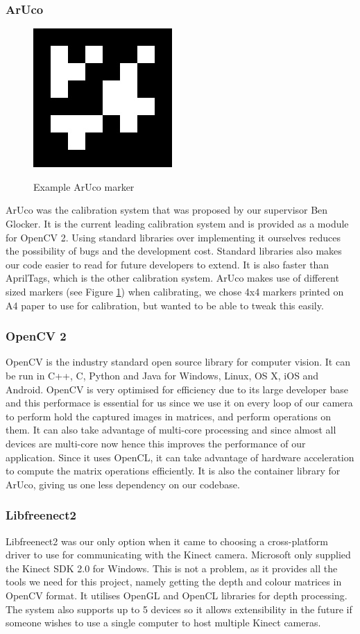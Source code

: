 \documentclass{article}
\begin{document}
\subsubsection{ArUco}
\begin{figure}[h]
  \centering
  \includegraphics[scale=0.6]{aruco}
  \label{fig:arucomarker}  
  \caption{Example ArUco marker}  
\end{figure} 
ArUco was the calibration system that was proposed by our supervisor Ben Glocker. It is the current leading calibration system and is provided as a module for OpenCV 2. Using standard libraries over implementing it ourselves reduces the possibility of bugs and the development cost. Standard libraries also makes our code easier to read for future developers to extend. It is also faster than AprilTags, which is the other calibration system. ArUco makes use of different sized markers (see Figure \ref{fig:arucomarker}) when calibrating, we chose 4x4 markers printed on A4 paper to use for calibration, but wanted to be able to tweak this easily.
\subsubsection{OpenCV 2}
OpenCV is the industry standard open source library for computer vision. It can be run in C++, C, Python and Java for Windows, Linux, OS X, iOS and Android. OpenCV is very optimised for efficiency due to its large developer base and this performace is essential for us since we use it on every loop of our camera to perform hold the captured images in matrices, and perform operations on them. It can also take advantage of multi-core processing and since almost all devices are multi-core now hence this improves the performance of our application. Since it uses OpenCL, it can take advantage of hardware acceleration to compute the matrix operations efficiently. It is also the container library for ArUco, giving us one less dependency on our codebase.
\subsubsection{Libfreenect2}
Libfreenect2 was our only option when it came to choosing a cross-platform driver to use for communicating with the Kinect camera. Microsoft only supplied the Kinect SDK 2.0 for Windows. This is not a problem, as it provides all the tools we need for this project, namely getting the depth and colour matrices in OpenCV format. It utilises OpenGL and OpenCL libraries for depth processing. The system also supports up to 5 devices so it allows extensibility in the future if someone wishes to use a single computer to host multiple Kinect cameras.
\end{document}
